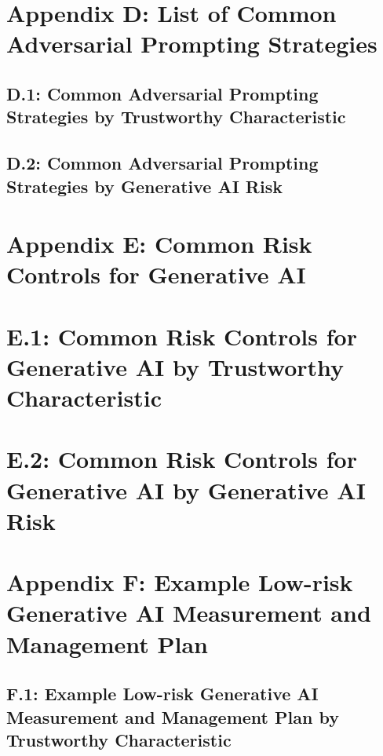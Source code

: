 \documentclass[fleqn]{article}
\begin{document}
\section*{Appendix D: List of Common Adversarial Prompting Strategies}\label{sec:appndxd}

\subsection*{D.1: Common Adversarial Prompting Strategies by Trustworthy Characteristic}\label{sec:appndxd1}

\subsection*{D.2: Common Adversarial Prompting Strategies by Generative AI Risk}\label{sec:appndxd2}

\section*{Appendix E: Common Risk Controls for Generative AI}\label{sec:appndxe}

\section*{E.1: Common Risk Controls for Generative AI by Trustworthy Characteristic}\label{sec:appndxe1}

\section*{E.2: Common Risk Controls for Generative AI by Generative AI Risk}\label{sec:appndxe2}

\section*{Appendix F: Example Low-risk Generative AI Measurement and Management Plan}\label{sec:appndxf}

\subsection{F.1: Example Low-risk Generative AI Measurement and Management Plan by Trustworthy Characteristic}\label{appdxf1}
\end{document}
